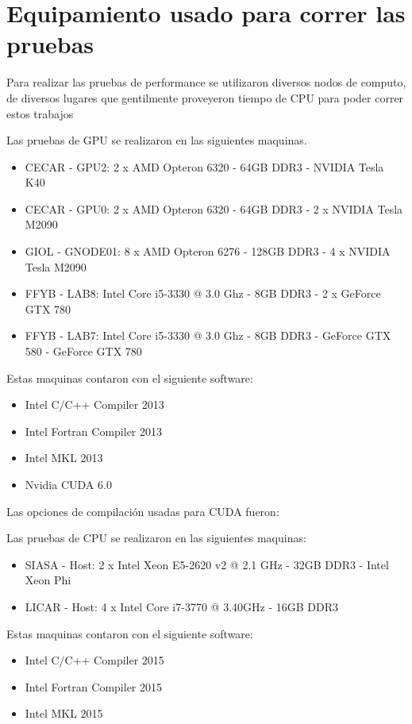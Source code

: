 \chapter{Equipamiento usado para correr las pruebas}
\label{testbench}

Para realizar las pruebas de performance se utilizaron diversos nodos de computo, de diversos lugares que
gentilmente proveyeron tiempo de CPU para poder correr estos trabajos

Las pruebas de GPU se realizaron en las siguientes maquinas.

\begin{itemize}
  \item CECAR - GPU2: 2 x AMD Opteron 6320 - 64GB DDR3 - NVIDIA Tesla K40
  \item CECAR - GPU0: 2 x AMD Opteron 6320 - 64GB DDR3 - 2 x NVIDIA Tesla M2090
  \item GIOL - GNODE01: 8 x AMD Opteron 6276 - 128GB DDR3 - 4 x NVIDIA Tesla M2090
  \item FFYB - LAB8: Intel Core i5-3330 @ 3.0 Ghz - 8GB DDR3 - 2 x GeForce GTX 780
  \item FFYB - LAB7: Intel Core i5-3330 @ 3.0 Ghz - 8GB DDR3 - GeForce GTX 580 - GeForce GTX 780
\end{itemize}

Estas maquinas contaron con el siguiente software:
\begin{itemize}
  \item Intel C/C++ Compiler 2013
  \item Intel Fortran Compiler 2013
  \item Intel MKL 2013
  \item Nvidia CUDA 6.0
\end{itemize}

Las opciones de compilaci\'on usadas para CUDA fueron:
\textit{}

Las pruebas de CPU se realizaron en las siguientes maquinas:
\begin{itemize}
  \item SIASA - Host: 2 x Intel Xeon E5-2620 v2 @ 2.1 GHz - 32GB DDR3 - Intel Xeon Phi
  \item LICAR - Host: 4 x Intel Core i7-3770 @ 3.40GHz - 16GB DDR3
\end{itemize}

Estas maquinas contaron con el siguiente software:
\begin{itemize}
  \item Intel C/C++ Compiler 2015
  \item Intel Fortran Compiler 2015
  \item Intel MKL 2015
\end{itemize}

